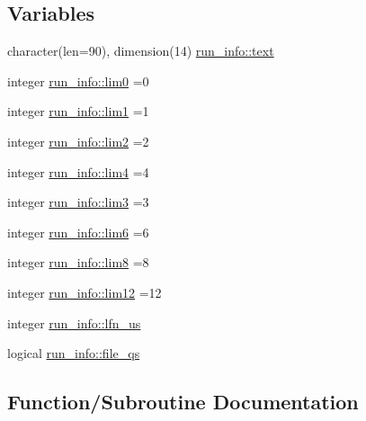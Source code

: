 \subsection*{Variables}
\begin{DoxyCompactItemize}
\item 
character(len=90), dimension(14) \hyperlink{namespacerun__info_a7ebcc0191b287ed4b8f80e6080cc1dc8}{run\+\_\+info\+::text}
\item 
integer \hyperlink{namespacerun__info_a4406caf0abae1b67ad05c7ed0c7904c0}{run\+\_\+info\+::lim0} =0
\item 
integer \hyperlink{namespacerun__info_adc3a55251266df823d3449b67005bade}{run\+\_\+info\+::lim1} =1
\item 
integer \hyperlink{namespacerun__info_af89da03470d913f288c8deaa72c81e98}{run\+\_\+info\+::lim2} =2
\item 
integer \hyperlink{namespacerun__info_a776a112d5d931e6d58195aac621d98c8}{run\+\_\+info\+::lim4} =4
\item 
integer \hyperlink{namespacerun__info_ad7a71d5b6da02d9fe343cf50247e63f1}{run\+\_\+info\+::lim3} =3
\item 
integer \hyperlink{namespacerun__info_a30737240d73cc13facaa16e6234df127}{run\+\_\+info\+::lim6} =6
\item 
integer \hyperlink{namespacerun__info_a541da993ba7c0323fde4a512605bbe8f}{run\+\_\+info\+::lim8} =8
\item 
integer \hyperlink{namespacerun__info_a635c9fcab621a64612a513a423762d84}{run\+\_\+info\+::lim12} =12
\item 
integer \hyperlink{namespacerun__info_ab21dc24ae87c9094754723447a6c94e5}{run\+\_\+info\+::lfn\+\_\+us}
\item 
logical \hyperlink{namespacerun__info_a0ccca59a580a8242d13b9e96cc6d1d4d}{run\+\_\+info\+::file\+\_\+qs}
\end{DoxyCompactItemize}


\subsection{Function/\+Subroutine Documentation}
\mbox{\label{_s_u_e_w_s___files__run___control_8f95_a4bb61265b8cfc958fdf7228bba82a224}} 
